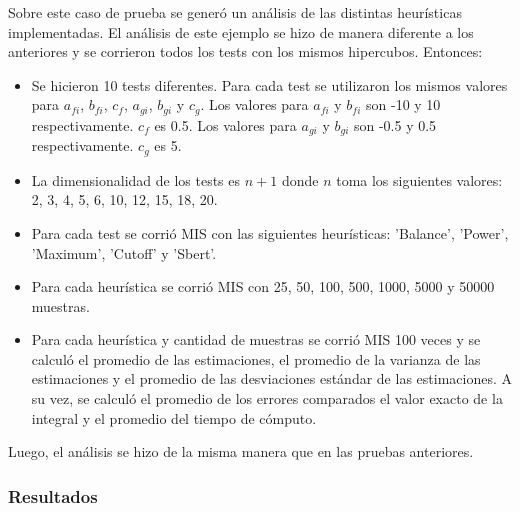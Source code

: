 \documentclass{article}
\begin{document}
Sobre este caso de prueba se generó un análisis de las distintas heurísticas implementadas.
El análisis de este ejemplo se hizo de manera diferente a los anteriores y se corrieron todos los tests con los mismos hipercubos.
Entonces:
\begin{itemize}
\item Se hicieron 10 tests diferentes. Para cada test se utilizaron los mismos valores para \( a_{fi} \), \( b_{fi} \), \( c_f \), \( a_{gi} \), \( b_{gi} \) y \( c_g \).
      Los valores para \( a_{fi} \) y \( b_{fi} \) son -10 y 10 respectivamente. \( c_f \) es 0.5.
      Los valores para \( a_{gi} \) y \( b_{gi} \) son -0.5 y 0.5 respectivamente. \( c_g \) es 5.
\item La dimensionalidad de los tests es \( n + 1 \) donde \( n \) toma los siguientes valores: 2, 3, 4, 5, 6, 10, 12, 15, 18, 20.
\item Para cada test se corrió MIS con las siguientes heurísticas: 'Balance', 'Power', 'Maximum', 'Cutoff' y 'Sbert'.
\item Para cada heurística se corrió MIS con 25, 50, 100, 500, 1000, 5000 y 50000 muestras.
\item Para cada heurística y cantidad de muestras se corrió MIS 100 veces y se calculó el promedio de las estimaciones,
      el promedio de la varianza de las estimaciones y el promedio de las desviaciones estándar de las estimaciones.
      A su vez, se calculó el promedio de los errores comparados el valor exacto de la integral y el promedio del tiempo de cómputo.
\end{itemize}

Luego, el análisis se hizo de la misma manera que en las pruebas anteriores.

\subsubsection{Resultados}
\end{document}
